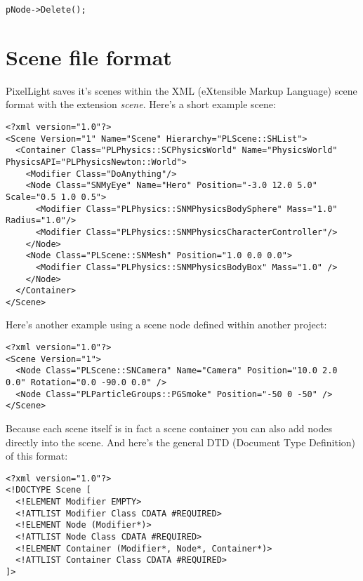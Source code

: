\begin{lstlisting}[caption=Delete a scene node]
pNode->Delete();
\end{lstlisting}




\section{Scene file format}
PixelLight saves it's scenes within the XML (eXtensible Markup Language) scene format with the extension \emph{scene}. Here's a short example scene:

\begin{lstlisting}[caption=Scene file example]
<?xml version="1.0"?>
<Scene Version="1" Name="Scene" Hierarchy="PLScene::SHList">
  <Container Class="PLPhysics::SCPhysicsWorld" Name="PhysicsWorld" PhysicsAPI="PLPhysicsNewton::World">
    <Modifier Class="DoAnything"/>
    <Node Class="SNMyEye" Name="Hero" Position="-3.0 12.0 5.0" Scale="0.5 1.0 0.5">
      <Modifier Class="PLPhysics::SNMPhysicsBodySphere" Mass="1.0" Radius="1.0"/>
      <Modifier Class="PLPhysics::SNMPhysicsCharacterController"/>
    </Node>
    <Node Class="PLScene::SNMesh" Position="1.0 0.0 0.0">
      <Modifier Class="PLPhysics::SNMPhysicsBodyBox" Mass="1.0" />
    </Node>
  </Container>
</Scene>
\end{lstlisting}

Here's another example using a scene node defined within another project:

\begin{lstlisting}[caption=Another scene file example]
<?xml version="1.0"?>
<Scene Version="1">
  <Node Class="PLScene::SNCamera" Name="Camera" Position="10.0 2.0 0.0" Rotation="0.0 -90.0 0.0" />
  <Node Class="PLParticleGroups::PGSmoke" Position="-50 0 -50" />
</Scene>
\end{lstlisting}

Because each scene itself is in fact a scene container you can also add nodes directly into the scene. And here's the general DTD (Document Type Definition) of this format:

\begin{lstlisting}[caption=Scene file format DTD]
<?xml version="1.0"?>
<!DOCTYPE Scene [
  <!ELEMENT Modifier EMPTY>
  <!ATTLIST Modifier Class CDATA #REQUIRED>
  <!ELEMENT Node (Modifier*)>
  <!ATTLIST Node Class CDATA #REQUIRED>
  <!ELEMENT Container (Modifier*, Node*, Container*)>
  <!ATTLIST Container Class CDATA #REQUIRED>
]>
\end{lstlisting}

